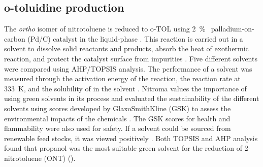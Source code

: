 \begin{comment}
Nitration in industry is mainly carried out by a mixed-acid process, whereby sulfuric acid donates a proton to nitric acid, yielding a nitronium ion which will then react with toluene []. In addition to favouring less economically desirable \textit{ortho} isomers, product separation from the acid and acid regeneration are expensive and energy intensive \cite{sreedhar_scientific_2013}. These drawbacks can be overcome by using solid acid catalysts which offer an environmentally friendly and economic alternative to sulfuric acid \cite{vassena_selective_1999}. Based on those arguments, Nitroma will develop a safer and low environmental impact process employing zeolite catalysts for toluene nitration. More specifically, the relative benefits and disadvantages of 3 different zeolites were evaluated with the AHP and TOPSIS decision analysis methods to select the optimum catalyst. The economic potential, performance and safety of zeolites H-ZSM-5, H-Y and H-Mordenite were assessed and compared to the case with no catalyst \cite{jeeru_kinetics_2018}. The economic potential was measured with the cost of the catalyst and the percentage of undesirable by-product formed. Conversion and the NFPA score are the KPIs for performance and safety respectively. H-Mordenite was found optimum for the catalytic nitration of toluene by both AHP and TOPSIS analysis (\Cref{app:matrix}). The kinetic model for the reaction was then developed and is presented in \Cref{app:kinetics}.
\end{comment}

\subsubsection{}

\subsection{o-toluidine production}

The \textit{ortho} isomer of nitrotoluene is reduced to o-TOL using \SI{2}{\percent\ww} palladium-on-carbon (Pd/C) catalyst in the liquid-phase \cite{rajadhyaksha_solvent_1986}. This reaction is carried out in a solvent to dissolve solid reactants and products, absorb the heat of exothermic reaction, and protect the catalyst surface from impurities \cite{yao_kinetics_1959}. Five different solvents were compared using AHP/TOPSIS analysis. The performance of a solvent was measured through the activation energy of the reaction, the reaction rate at \SI{333}{\K}, and the solubility of  in the solvent \cite{rajadhyaksha_solvent_1986}. Nitroma values the importance of using green solvents in its process and evaluated the sustainability of the different solvents using scores developed by GlaxoSmithKline (GSK) to assess the environmental impacts of the chemicals \cite{henderson_expanding_2011}. The GSK scores for health and flammability were also used for safety. If a solvent could be sourced from renewable feed stocks, it was viewed positively \cite{byrne_tools_2016}. Both TOPSIS and AHP analysis found that propanol was the most suitable green solvent for the reduction of 2-nitrotoluene (ONT) ().

